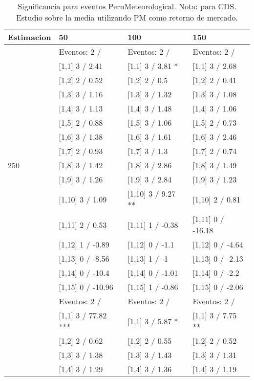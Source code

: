 \begin{table}

\caption{Significancia para eventos PeruMeteorological. Nota: para CDS. Estudio sobre la media utilizando PM como retorno de mercado.}
\centering
\begin{tabular}[t]{llll}
\toprule
Estimacion & 50 & 100 & 150\\
\midrule
 & Eventos:  2 / & Eventos:  2 / & Eventos:  2 /\\
 & {}[1,1] 3  / 2.41 & {}[1,1] 3  / 3.81 * & {}[1,1] 3  / 2.68\\
 & {}[1,2] 2  / 0.52 & {}[1,2] 2  / 0.5 & {}[1,2] 2  / 0.41\\
 & {}[1,3] 3  / 1.16 & {}[1,3] 3  / 1.32 & {}[1,3] 3  / 1.08\\
 & {}[1,4] 3  / 1.13 & {}[1,4] 3  / 1.48 & {}[1,4] 3  / 1.06\\
\addlinespace
 & {}[1,5] 2  / 0.88 & {}[1,5] 3  / 1.06 & {}[1,5] 2  / 0.73\\
 & {}[1,6] 3  / 1.38 & {}[1,6] 3  / 1.61 & {}[1,6] 3  / 2.46\\
 & {}[1,7] 2  / 0.93 & {}[1,7] 3  / 1.3 & {}[1,7] 2  / 0.74\\
250 & {}[1,8] 3  / 1.42 & {}[1,8] 3  / 2.86 & {}[1,8] 3  / 1.49\\
 & {}[1,9] 3  / 1.26 & {}[1,9] 3  / 2.84 & {}[1,9] 3  / 1.23\\
\addlinespace
 & {}[1,10] 3  / 1.09 & {}[1,10] 3  / 9.27 ** & {}[1,10] 2  / 0.81\\
 & {}[1,11] 2  / 0.53 & {}[1,11] 1  / -0.38 & {}[1,11] 0  / -16.18\\
 & {}[1,12] 1  / -0.89 & {}[1,12] 0  / -1.1 & {}[1,12] 0  / -4.64\\
 & {}[1,13] 0  / -8.56 & {}[1,13] 1  / -1 & {}[1,13] 0  / -2.13\\
 & {}[1,14] 0  / -10.4 & {}[1,14] 0  / -1.01 & {}[1,14] 0  / -2.2\\
\addlinespace
 & {}[1,15] 0  / -10.96 & {}[1,15] 1  / -0.86 & {}[1,15] 0  / -2.06\\
 & Eventos:  2 / & Eventos:  2 / & Eventos:  2 /\\
 & {}[1,1] 3  / 77.82 *** & {}[1,1] 3  / 5.87 * & {}[1,1] 3  / 7.75 **\\
 & {}[1,2] 2  / 0.62 & {}[1,2] 2  / 0.55 & {}[1,2] 2  / 0.52\\
 & {}[1,3] 3  / 1.38 & {}[1,3] 3  / 1.43 & {}[1,3] 3  / 1.31\\
\addlinespace
 & {}[1,4] 3  / 1.29 & {}[1,4] 3  / 1.36 & {}[1,4] 3  / 1.19\\

\end{tabular}
\end{table}
